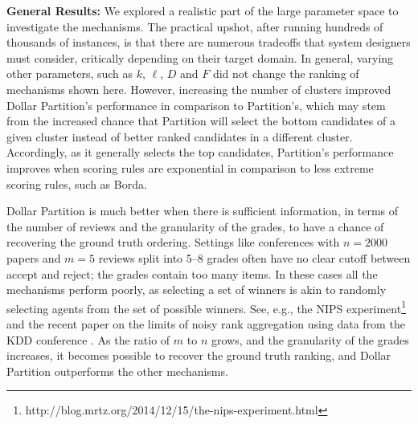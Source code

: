 \documentclass[letterpaper]{article}
\begin{document}

\smallskip
\noindent
\textbf{General Results:} We explored a realistic part of the large parameter space to investigate the mechanisms. The practical upshot, after running hundreds of thousands of instances, is that there are numerous tradeoffs that system designers must consider, critically depending on their target domain. In general, varying other parameters, such as $k$, $\ell$, $D$ and $F$ did not change the ranking of mechanisms shown here. However, increasing the number of clusters improved Dollar Partition's performance in comparison to Partition's, which may stem from the increased chance that Partition will select the bottom candidates of a given cluster instead of better ranked candidates in a different cluster. Accordingly, as it generally selects the top candidates, Partition's performance improves when scoring rules are exponential in comparison to less extreme scoring rules, such as Borda.

Dollar Partition is much better when there is sufficient information, in terms of the number of reviews and the granularity of the grades, to have a chance of recovering the ground truth ordering. Settings like conferences with $n=2000$ papers and $m=5$ reviews split into 5--8 grades often have no clear cutoff between accept and reject; the grades contain too many items. In these cases all the mechanisms perform poorly, as selecting a set of winners is akin to randomly selecting agents from the set of possible winners. See, e.g., the NIPS experiment\footnote{http://blog.mrtz.org/2014/12/15/the-nips-experiment.html} and the recent paper on the limits of noisy rank aggregation using data from the KDD conference \cite{JoRa15a}. As the ratio of $m$ to $n$ grows, and the granularity of the grades increases, it becomes possible to recover the ground truth ranking, and Dollar Partition outperforms the other mechanisms.
\end{document}
